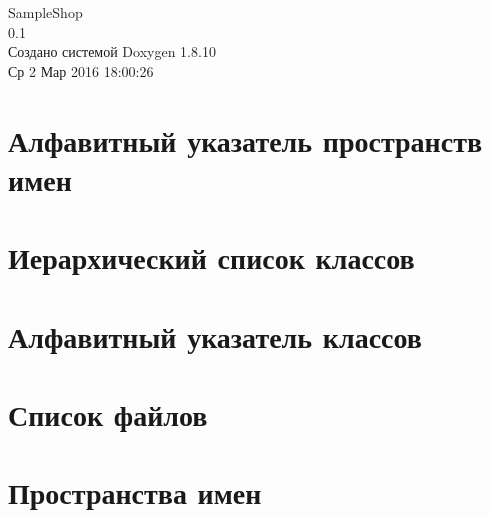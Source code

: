 \documentclass[twoside]{book}
\newcommand{\+}{\discretionary{\mbox{\scriptsize$\hookleftarrow$}}{}{}}
\newcommand{\clearemptydoublepage}{%
  \newpage{\pagestyle{empty}\cleardoublepage}%
}
\begin{document}
\hypersetup{pageanchor=false,
             bookmarks=true,
             bookmarksnumbered=true,
             pdfencoding=unicode
            }
\begin{titlepage}
\vspace*{7cm}
\begin{center}%
{\Large Sample\+Shop \\[1ex]\large 0.\+1 }\\
\vspace*{1cm}
{\large Создано системой Doxygen 1.8.10}\\
\vspace*{0.5cm}
{\small Ср 2 Мар 2016 18:00:26}\\
\end{center}
\end{titlepage}
\clearemptydoublepage
\tableofcontents
\clearemptydoublepage
{}
\hypersetup{pageanchor=true}

\chapter{Алфавитный указатель пространств имен}

\chapter{Иерархический список классов}

\chapter{Алфавитный указатель классов}

\chapter{Список файлов}

\chapter{Пространства имен}










\end{document}
